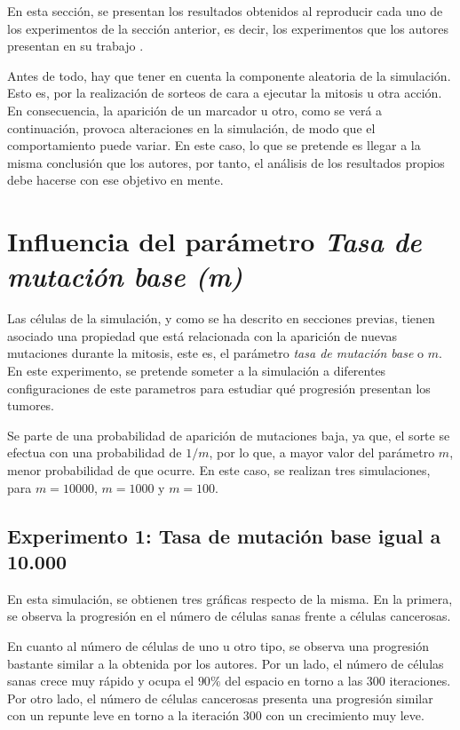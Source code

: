 En esta sección, se presentan los resultados obtenidos al reproducir cada uno de
los experimentos de la sección anterior, es decir, los experimentos que los autores
presentan en su trabajo \cite{jsantos-amonteagudo-1-2014}.

Antes de todo, hay que tener en cuenta la componente aleatoria de la simulación. Esto es, por
la realización de sorteos de cara a ejecutar la mitosis u otra acción. En consecuencia, la aparición
de un marcador u otro, como se verá a continuación, provoca alteraciones en la simulación, de modo que
el comportamiento puede variar. En este caso, lo que se pretende es llegar a la misma conclusión que los autores,
por tanto, el análisis de los resultados propios debe hacerse con ese objetivo en mente.

\section{Influencia del parámetro \textit{Tasa de mutación base (m)}}

Las células de la simulación, y como se ha descrito en secciones previas, tienen asociado una propiedad que está relacionada con la aparición
de nuevas mutaciones durante la mitosis, este es, el parámetro \textit{tasa de mutación base} o $m$. En este experimento,
se pretende someter a la simulación a diferentes configuraciones de este parametros para estudiar qué
progresión presentan los tumores.

Se parte de una probabilidad de aparición de mutaciones baja, ya que, el sorte se efectua con una probabilidad de
$1/m$, por lo que, a mayor valor del parámetro $m$, menor probabilidad de que ocurre. En este caso, se
realizan tres simulaciones, para $m=10000$, $m=1000$ y $m=100$.

\subsection{Experimento 1: Tasa de mutación base igual a 10.000}

En esta simulación, se obtienen tres gráficas respecto de la misma. En la primera, se observa la progresión
en el número de células sanas frente a células cancerosas.

En cuanto al número de células de uno u otro tipo, se observa una progresión bastante similar a la obtenida por los autores.
Por un lado, el número de células sanas crece muy rápido y ocupa el $90\%$ del espacio en torno a las $300$ iteraciones. Por otro lado,
el número de células cancerosas presenta una progresión similar con un repunte leve en torno a la iteración $300$ con un crecimiento muy leve.


